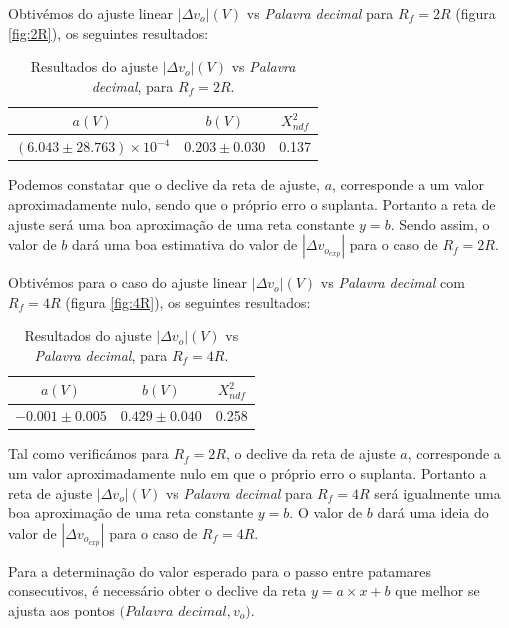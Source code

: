 \documentclass[a4paper,11pt]{report}
\begin{document}
Obtivémos do ajuste linear $|\Delta v_o| (V)$ vs \textit{Palavra decimal} para $R_f=2R$ (figura \ref{fig:2R}), os seguintes resultados:

\begin{table}[h]
\begin{center}
\begin{tabular}{ || c | c | c || }
\hline
$a(V)$ & $b(V)$ &  $X^2_{ndf}$\\ \hline \hline
$\left(6.043 \pm 28.763 \right)\times 10^{-4}$ & $0.203 \pm 0.030$ &0.137\\ \hline

\end{tabular}

\caption{Resultados do ajuste $|\Delta v_o| (V)$ vs \textit{Palavra decimal}, para $R_f=2R$.\label{tab:res2R}}
\end{center}
\end{table}

Podemos constatar que o declive da reta de ajuste, $a$, corresponde a um valor aproximadamente nulo, sendo que o próprio erro o suplanta. Portanto a reta de ajuste será uma boa aproximação de uma reta constante $y=b$.  Sendo assim, o valor de $b$ dará uma boa estimativa do valor de $|\Delta v_{o_{exp}}|$ para o caso de $R_f=2R$. \\
\par
Obtivémos para o caso do ajuste linear $|\Delta v_o| (V)$ vs \textit{Palavra decimal} com $R_f=4R$ (figura \ref{fig:4R}), os seguintes resultados:

\begin{table}[h]
\begin{center}
\begin{tabular}{ || c | c | c || }
\hline
$a(V)$ & $b(V)$ &  $X^2_{ndf}$\\ \hline \hline
$-0.001 \pm 0.005$ & $0.429 \pm 0.040$ &0.258\\ \hline

\end{tabular}

\caption{Resultados do ajuste $|\Delta v_o| (V)$ vs \textit{Palavra decimal}, para $R_f=4R$.\label{tab:res2R}}
\end{center}
\end{table}

Tal como verificámos para $R_f=2R$, o declive da reta de ajuste $a$, corresponde a um valor aproximadamente nulo em que o próprio erro o suplanta. Portanto a reta de ajuste $|\Delta v_o| (V)$ vs \textit{Palavra decimal} para $R_f=4R$ será igualmente uma boa aproximação de uma reta constante $y=b$. O valor de $b$ dará uma ideia do valor de $|\Delta v_{o_{exp}}|$ para o caso de $R_f=4R$.\\
\par
Para a determinação do valor esperado para o passo entre patamares consecutivos, é necessário obter o declive da reta $y=a\times x+b$ que melhor se ajusta aos pontos $(Palavra$ $decimal,v_o)$.
\end{document}
